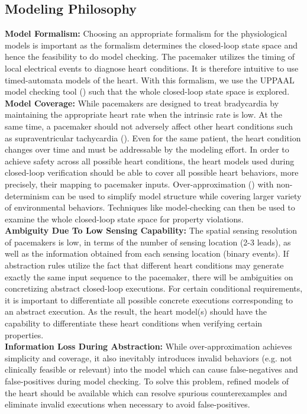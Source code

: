 \subsection{Modeling Philosophy}
\textbf{Model Formalism: }Choosing an appropriate formalism for the physiological models is important as the formalism determines the closed-loop state space and hence the feasibility to do model checking. The pacemaker utilizes the timing of local electrical events to diagnose heart conditions. It is therefore intuitive to use timed-automata models of the heart. With this formalism, we use the UPPAAL model checking tool (\cite{uppaal_tut}) such that the whole closed-loop state space is explored.\\
\textbf{Model Coverage: } While pacemakers are designed to treat bradycardia by maintaining the appropriate heart rate when the intrinsic rate is low. At the same time, a pacemaker should not adversely affect other heart conditions such as supraventricular tachycardia (\cite{pacemakerrecalls}). Even for the same patient, the heart condition changes over time and must be addressable by the modeling effort. In order to achieve safety across all possible heart conditions, the heart models used during closed-loop verification should be able to cover all possible heart behaviors, more precisely, their mapping to pacemaker inputs. Over-approximation (\cite{CEGAR}) with non-determinism can be used to simplify model structure while covering larger variety of environmental behaviors. Techniques like model-checking can then be used to examine the whole closed-loop state space for property violations.\\ 
\textbf{Ambiguity Due To Low Sensing Capability: }The spatial sensing resolution of pacemakers is low, in terms of the number of sensing location (2-3 leads), as well as the information obtained from each sensing location (binary events). If abstraction rules utilize the fact that different heart conditions may generate exactly the same input sequence to the pacemaker, there will be ambiguities on concretizing abstract closed-loop executions. For certain conditional requirements, it is important to differentiate all possible concrete executions corresponding to an abstract execution. As the result, the heart model(s) should have the capability to differentiate these heart conditions when verifying certain properties.\\
\textbf{Information Loss During Abstraction: }While over-approximation achieves simplicity and coverage, it also inevitably introduces invalid behaviors (e.g. not clinically feasible or relevant) into the model which can cause false-negatives and false-positives during model checking. To solve this problem, refined models of the heart should be available which can resolve spurious counterexamples and eliminate invalid executions when necessary to avoid false-positives.

